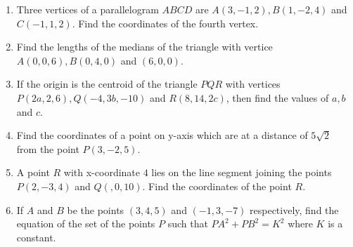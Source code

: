 \begin{enumerate}
\item Three vertices of a parallelogram $ABCD$ are $A(3,-1,2), B(1,-2,4)$ and $C(-1,1,2)$. Find the coordinates of the fourth vertex.
\item Find the lengths of the medians of the triangle with vertice $A(0,0,6), B(0,4,0)$ and $(6,0,0)$.
\item If the origin is the centroid of the triangle $PQR$ with vertices $P(2a,2,6), Q(-4,3b,-10)$ and $R(8,14,2c)$, then find the values of $a, b$ and $c$.
\item Find the coordinates of a point on y-axis which are at a distance of $5\sqrt2$ from the point $P(3,-2,5)$.
\item A point $R$ with x-coordinate $4$ lies on the line segment joining the points $P(2,-3,4)$ and $Q(,0,10)$. Find the coordinates of the point $R$.
\item If $A$ and $B$ be the points $(3,4,5)$ and $(-1,3,-7)$ respectively, find the equation of the set of the points $P$ such that $PA^2+PB^2=K^2$ where $K$ is a constant.
\end{enumerate}
